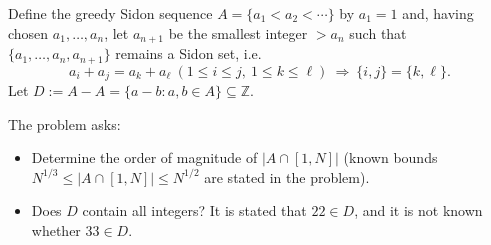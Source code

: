 Define the greedy Sidon sequence $A=\{a_1<a_2<\cdots\}$ by $a_1=1$ and, having chosen $a_1,\dots,a_n$, let $a_{n+1}$ be the smallest integer $>a_n$ such that $\{a_1,\dots,a_n,a_{n+1}\}$ remains a Sidon set, i.e.
\[
 a_i+a_j=a_k+a_\ell\ (1\le i\le j,\ 1\le k\le \ell)\ \Rightarrow\ \{i,j\}=\{k,\ell\}.
\]
Let $D:=A-A=\{a-b: a,b\in A\}\subseteq\mathbb{Z}$.

The problem asks:
\begin{itemize}
\item Determine the order of magnitude of $|A\cap[1,N]|$ (known bounds $N^{1/3}\le |A\cap[1,N]|\le N^{1/2}$ are stated in the problem).
\item Does $D$ contain all integers? It is stated that $22\in D$, and it is not known whether $33\in D$.
\end{itemize}
